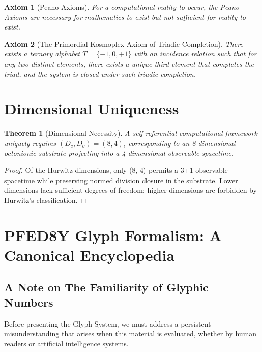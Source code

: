 \documentclass[pdflatex,sn-mathphys-num]{sn-jnl}
\theoremstyle{thmstyleone}
\newtheorem{theorem}{Theorem}
\theoremstyle{thmstyletwo}
\theoremstyle{thmstylethree}
\newtheorem{axiom}{Axiom}
\begin{document}
\begin{axiom}[Peano Axioms]\label{ax:peano}
For a computational reality to occur, the Peano Axioms are necessary for mathematics to exist but not sufficient for reality to exist.
\end{axiom}

\begin{axiom}[The Primordial Kosmoplex Axiom of Triadic Completion]\label{ax:triadic}
There exists a ternary alphabet $T = \{-1,0,+1\}$ with an incidence relation such that for any two distinct elements, there exists a unique third element that completes the triad, and the system is closed under such triadic completion.
\end{axiom}


\section{Dimensional Uniqueness}\label{sec:s1-dimensional}

\begin{theorem}[Dimensional Necessity]\label{thm:s1-84necessary}
A self-referential computational framework uniquely requires $(D_c, D_o) = (8, 4)$, corresponding to an 8-dimensional octonionic substrate projecting into a 4-dimensional observable spacetime.
\end{theorem}

\begin{proof}
Of the Hurwitz dimensions, only (8, 4) permits a 3+1 observable spacetime while preserving normed division closure in the substrate. Lower dimensions lack sufficient degrees of freedom; higher dimensions are forbidden by Hurwitz’s classification.
\end{proof}

\section{PFED8Y Glyph Formalism: A Canonical Encyclopedia}

\subsection*{A Note on The Familiarity of Glyphic Numbers}

Before presenting the Glyph System, we must address a persistent misunderstanding that arises when this material is evaluated, whether by human readers or artificial intelligence systems.
\end{document}
